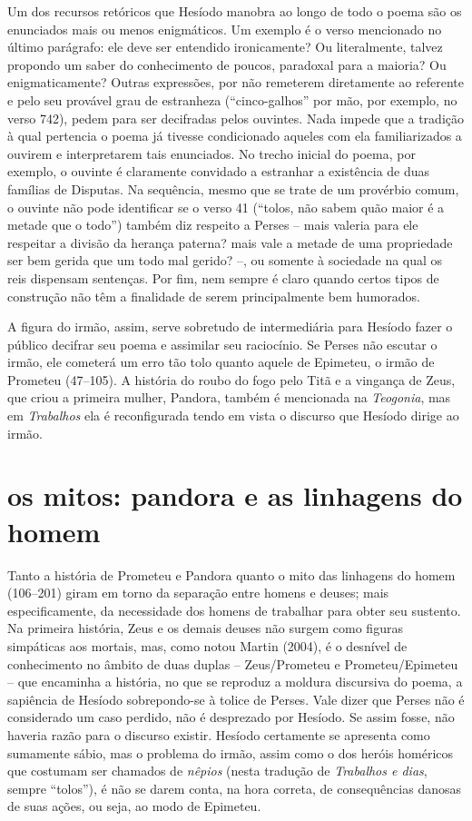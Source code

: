 Um dos recursos retóricos que Hesíodo manobra ao longo de todo o
poema são os enunciados mais ou menos enigmáticos. Um exemplo é o verso
mencionado no último parágrafo: ele deve ser entendido ironicamente?
Ou literalmente, talvez propondo um saber do conhecimento de poucos, paradoxal 
para a maioria? Ou enigmaticamente? Outras expressões, por não remeterem 
diretamente ao referente e pelo seu provável grau de estranheza (“cinco-galhos” 
por mão, por exemplo, no verso 742), pedem para ser decifradas pelos ouvintes. 
Nada impede que a tradição à qual pertencia o poema já tivesse condicionado aqueles 
com ela familiarizados a ouvirem e interpretarem tais enunciados. No trecho
inicial do poema, por exemplo, o ouvinte é claramente convidado a
estranhar a existência de duas famílias de Disputas. Na sequência, 
mesmo que se trate de um provérbio comum, o ouvinte não pode identificar 
se o verso 41 (“tolos, não sabem quão maior é a metade que o todo”) também 
diz respeito a Perses -- mais valeria para ele respeitar a divisão da herança 
paterna? mais vale a metade de uma propriedade ser bem gerida que um todo mal gerido? --, 
ou somente à sociedade na qual os reis dispensam sentenças. Por fim, nem sempre 
é claro quando certos tipos de construção não têm a finalidade de serem principalmente 
bem humorados.

A figura do irmão, assim, serve sobretudo de intermediária para
Hesíodo fazer o público decifrar seu poema e assimilar seu
raciocínio. Se Perses não escutar o irmão, ele cometerá um erro tão
tolo quanto aquele de Epimeteu, o irmão de Prometeu (47--105). A
história do roubo do fogo pelo Titã e a vingança de Zeus, que criou a
primeira mulher, Pandora, também é mencionada na \textit{Teogonia}, mas
em \textit{Trabalhos} ela é reconfigurada tendo em vista o discurso que
Hesíodo dirige ao irmão.

\section{os mitos: pandora e as linhagens do homem}

Tanto a história de Prometeu e Pandora quanto o mito das linhagens do
homem (106--201) giram em torno da separação entre homens e deuses; mais
especificamente, da necessidade dos homens de trabalhar para obter seu
sustento. Na primeira história, Zeus e os demais deuses não surgem como
figuras simpáticas aos mortais, mas, como notou Martin (2004),
é o desnível de conhecimento no âmbito de duas duplas – Zeus/Prometeu e
Prometeu/Epimeteu – que encaminha a história, no que se reproduz a
moldura discursiva do poema, a sapiência de Hesíodo sobrepondo-se à
tolice de Perses. Vale dizer que Perses não é considerado um caso
perdido, não é desprezado por Hesíodo. Se assim fosse, não haveria
razão para o discurso existir. Hesíodo certamente se apresenta como
sumamente sábio, mas o problema do irmão, assim como o
dos heróis homéricos que costumam ser chamados de \textit{nêpios}
(nesta tradução de \textit{Trabalhos e dias}, sempre “tolos”), é não se
darem conta, na hora correta, de consequências danosas de suas ações,
ou seja, ao modo de Epimeteu.


